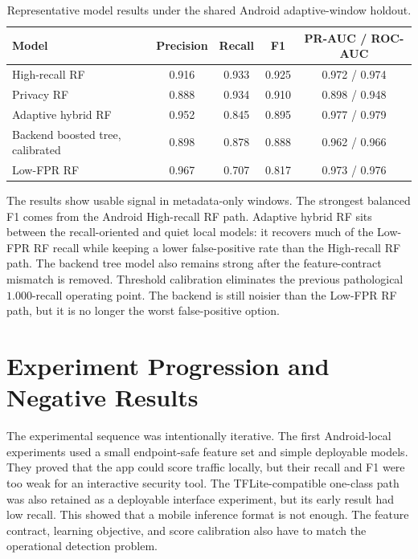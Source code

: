 \begin{table}[htbp]
  \centering
  \caption{Representative model results under the shared Android adaptive-window holdout.}
  \label{tab:model-matrix}
  \small
  \begin{tabular}{>{\raggedright\arraybackslash}p{4.0cm}cccc}
    \toprule
    Model & Precision & Recall & F1 & PR-AUC / ROC-AUC \\
    \midrule
    High-recall RF & 0.916 & 0.933 & 0.925 & 0.972 / 0.974 \\
    Privacy RF & 0.888 & 0.934 & 0.910 & 0.898 / 0.948 \\
    Adaptive hybrid RF & 0.952 & 0.845 & 0.895 & 0.977 / 0.979 \\
    Backend boosted tree, calibrated & 0.898 & 0.878 & 0.888 & 0.962 / 0.966 \\
    Low-FPR RF & 0.967 & 0.707 & 0.817 & 0.973 / 0.976 \\
    \bottomrule
  \end{tabular}
\end{table}

The results show usable signal in metadata-only windows. The strongest balanced F1 comes from the
Android High-recall RF path. Adaptive hybrid RF sits between the recall-oriented and quiet local
models: it recovers much of the Low-FPR RF recall while keeping a lower false-positive rate than the
High-recall RF path. The backend tree model also remains strong after the feature-contract mismatch
is removed. Threshold calibration eliminates the previous pathological \(1.000\)-recall operating
point. The backend is still noisier than the Low-FPR RF path, but it is no longer the worst
false-positive option.

\section{Experiment Progression and Negative Results}
The experimental sequence was intentionally iterative. The first Android-local experiments used a
small endpoint-safe feature set and simple deployable models. They proved that the app could score
traffic locally, but their recall and F1 were too weak for an interactive security tool. The
TFLite-compatible one-class path was also retained as a deployable interface experiment, but its
early result had low recall. This showed that a mobile inference format is not enough. The feature
contract, learning objective, and score calibration also have to match the operational detection
problem.

